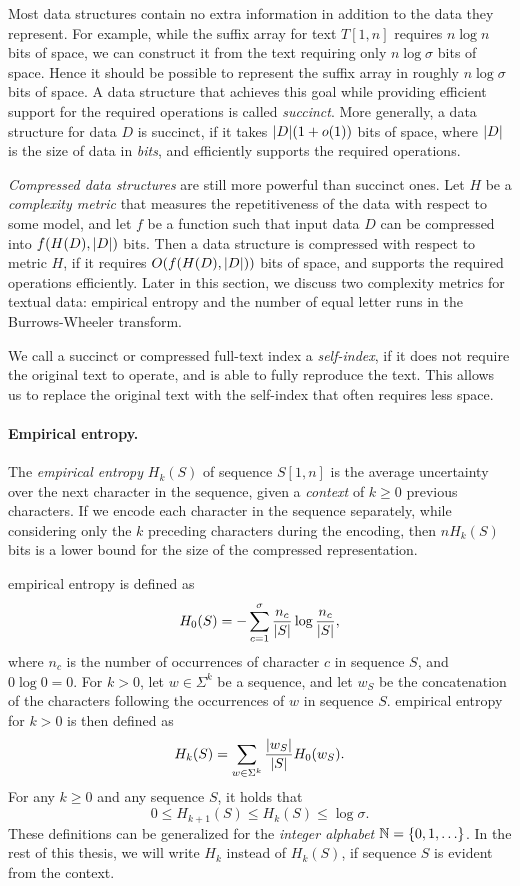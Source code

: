 Most data structures contain no extra information in addition to the data they represent. For example, while the suffix array for text $T[1,n]$ requires $n \log n$ bits of space, we can construct it from the text requiring only $n \log \sigma$ bits of space. Hence it should be possible to represent the suffix array in roughly $n \log \sigma$ bits of space. A data structure that achieves this goal while providing efficient support for the required operations is called \emph{succinct}. More generally, a data structure for data $D$ is succinct, if it takes $\lvert D \rvert(1+o(1))$ bits of space, where $\lvert D \rvert$ is the size of data in \emph{bits}, and efficiently supports the required operations.

\emph{Compressed data structures} are still more powerful than succinct ones. Let $H$ be a \emph{complexity metric} that measures the repetitiveness of the data with respect to some model, and let $f$ be a function such that input data $D$ can be compressed into $f(H(D), \lvert D \rvert)$ bits. Then a data structure is compressed with respect to metric $H$, if it requires $O(f(H(D), \lvert D \rvert))$ bits of space, and supports the required operations efficiently. Later in this section, we discuss two complexity metrics for textual data: empirical entropy and the number of equal letter runs in the Burrows-Wheeler transform.

We call a succinct or compressed full-text index a \emph{self-index}, if it does not require the original text to operate, and is able to fully reproduce the text. This allows us to replace the original text with the self-index that often requires less space.

\paragraph{Empirical entropy.}

The \emph{empirical entropy} \cite{Manzini2001} $H_{k}(S)$ of sequence $S[1,n]$ is the average uncertainty over the next character in the sequence, given a \emph{context} of $k \ge 0$ previous characters. If we encode each character in the sequence separately, while considering only the $k$ preceding characters during the encoding, then $nH_{k}(S)$ bits is a lower bound for the size of the compressed representation.

 empirical entropy is defined as
$$
H_{0}(S) = - \sum_{c=1}^{\sigma} \frac{n_{c}}{\lvert S \rvert} \log \frac{n_{c}}{\lvert S \rvert},
$$
where $n_{c}$ is the number of occurrences of character $c$ in sequence $S$, and $0 \log 0 = 0$. For $k > 0$, let $w \in \Sigma^{k}$ be a sequence, and let $w_{S}$ be the concatenation of the characters following the occurrences of $w$ in sequence $S$.  empirical entropy for $k > 0$ is then defined as
$$
H_{k}(S) = \sum_{w \in \Sigma^{k}} \frac{\lvert w_{S} \rvert}{\lvert S \rvert} H_{0}(w_{S}).
$$
For any $k \ge 0$ and any sequence $S$, it holds that
$$
0 \le H_{k+1}(S) \le H_{k}(S) \le \log \sigma.
$$
These definitions can be generalized for the \emph{integer alphabet} $\mathbb{N} = \set{0, 1, \dotsc}$. In the rest of this thesis, we will write $H_{k}$ instead of $H_{k}(S)$, if sequence $S$ is evident from the context.

